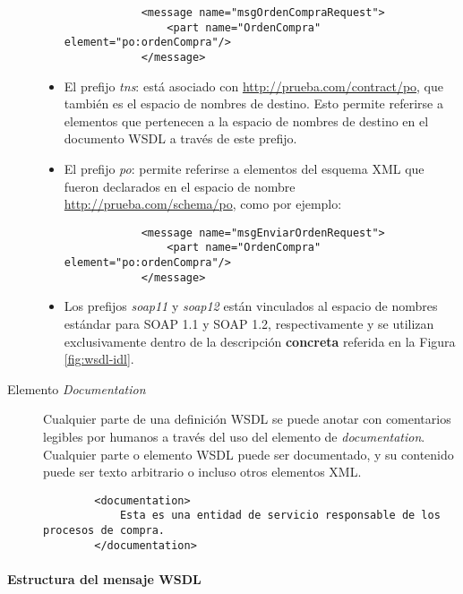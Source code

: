 \begin{description}
\begin{itemize}
 	 
 		\begin{lstlisting}
 			<message name="msgOrdenCompraRequest">
 				<part name="OrdenCompra" element="po:ordenCompra"/>
 			</message>
 		\end{lstlisting}
 		
 		\item El prefijo \textit{tns}: está asociado con \url{http://prueba.com/contract/po}, que también es el espacio de nombres de destino. Esto permite referirse a elementos que pertenecen a la
 		espacio de nombres de destino en el documento WSDL a través de este prefijo.
 		
 		\item El prefijo \textit{po}: permite referirse a elementos del esquema XML que fueron declarados en el espacio de nombre   \url{http://prueba.com/schema/po},  como por ejemplo:
 		
 		\begin{lstlisting}
 			<message name="msgEnviarOrdenRequest">
 				<part name="OrdenCompra" element="po:ordenCompra"/>
 			</message>
 		\end{lstlisting}
 		
 		\item Los prefijos  \textit{soap11} y \textit{soap12} están vinculados al espacio de nombres estándar  para SOAP 1.1 y SOAP 1.2, respectivamente y se utilizan exclusivamente dentro de la  descripción \textbf{concreta} referida en la Figura \ref{fig:wsdl-idl}.
 		
 	\end{itemize}
 	
 	\item[Elemento \textit{Documentation}]
 	Cualquier parte de una definición WSDL se puede anotar con comentarios legibles por humanos a través del uso del elemento de \textit{documentation}. Cualquier parte o elemento WSDL puede ser documentado, y su contenido puede ser texto arbitrario o incluso otros elementos XML.
 	
 	\begin{lstlisting}
 		<documentation>
 			Esta es una entidad de servicio responsable de los procesos de compra.
 		</documentation>
 	\end{lstlisting}
 		
 \end{description}
 
 \paragraph{Estructura del mensaje WSDL}
 
